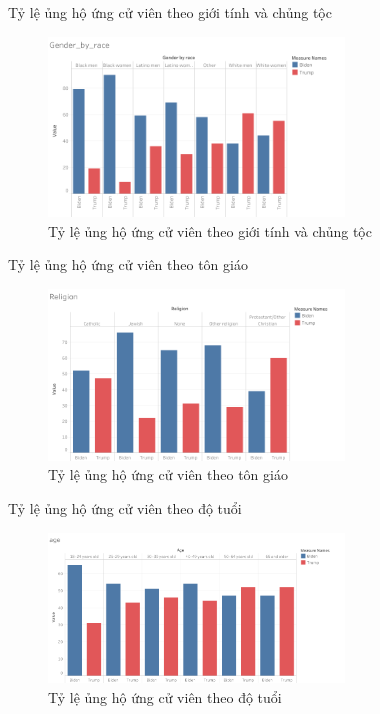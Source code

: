 \documentclass[10pt]{beamer}
\theoremstyle{remark}
\theoremstyle{definition}
\begin{document}
\begin{frame}{Tỷ lệ ủng hộ ứng cử viên theo giới tính và chủng tộc}
	\begin{figure}[h!]
        \centering
        \includegraphics[width=0.7\textwidth]{figures/Gender_by_race.png}
        \caption{Tỷ lệ ủng hộ ứng cử viên theo giới tính và chủng tộc}
    \end{figure}
\end{frame}

\begin{frame}{Tỷ lệ ủng hộ ứng cử viên theo tôn giáo}
	\begin{figure}[h!]
        \centering
        \includegraphics[width=0.7\textwidth]{figures/Religion.png}
        \caption{Tỷ lệ ủng hộ ứng cử viên theo tôn giáo}
    \end{figure}
\end{frame}

\begin{frame}{Tỷ lệ ủng hộ ứng cử viên theo độ tuổi}
	\begin{figure}[h!]
        \centering
        \includegraphics[width=0.7\textwidth]{figures/age.png}
        \caption{Tỷ lệ ủng hộ ứng cử viên theo độ tuổi}
    \end{figure}
\end{frame}
\end{document}
